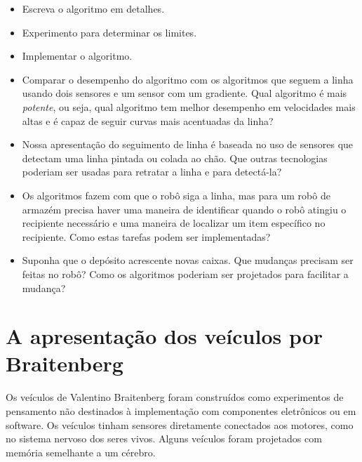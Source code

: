 \begin{framed}
\begin{itemize}
\item Escreva o algoritmo em detalhes.
\item Experimento para determinar os limites.
\item Implementar o algoritmo.
\item Comparar o desempenho do algoritmo com os algoritmos que seguem a linha usando dois sensores e um sensor com um gradiente. Qual algoritmo é mais \emph{potente}, ou seja, qual algoritmo tem melhor desempenho em velocidades mais altas e é capaz de seguir curvas mais acentuadas da linha?
\end{itemize}
\end{framed}

\begin{framed}
\begin{itemize}
\item Nossa apresentação do seguimento de linha é baseada no uso de sensores que detectam uma linha pintada ou colada ao chão. Que outras tecnologias poderiam ser usadas para retratar a linha e para detectá-la?
\item Os algoritmos fazem com que o robô siga a linha, mas para um robô de armazém precisa haver uma maneira de identificar quando o robô atingiu o recipiente necessário e uma maneira de localizar um item específico no recipiente. Como estas tarefas podem ser implementadas?
\item Suponha que o depósito acrescente novas caixas. Que mudanças precisam ser feitas no robô? Como os algoritmos poderiam ser projetados para facilitar a mudança?
\end{itemize}
\end{framed}

\section{A apresentação dos veículos por Braitenberg}\label{s.abstract-vehicles}

Os veículos de Valentino Braitenberg foram construídos como experimentos de pensamento não destinados à implementação com componentes eletrônicos ou em software. Os veículos tinham sensores diretamente conectados aos motores, como no sistema nervoso dos seres vivos. Alguns veículos foram projetados com memória semelhante a um cérebro.

